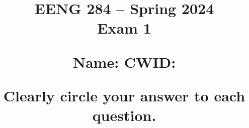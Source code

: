 \documentclass{article}
\begin{document}
\newcommand{\SOPmin}{${\rm SOP}_{\rm min} \ $}
\newcommand{\POSmin}{${\rm POS}_{\rm min} \ $}
\newcommand{\bs}{\backslash}


\title{
\normalsize{EENG 284 -- Spring 2024}\\
\normalsize{Exam 1} \\

\vspace{0.2 in}

Name: \fbox{\rule{2in}{0pt}\rule[-0.5ex]{0pt}{4ex}} 
CWID: \fbox{\rule{1in}{0pt}\rule[-0.5ex]{0pt}{4ex}} \\
\date{}
\vspace{0.2 in}
Clearly circle your answer to each question.
}

\maketitle{}
\end{document}
